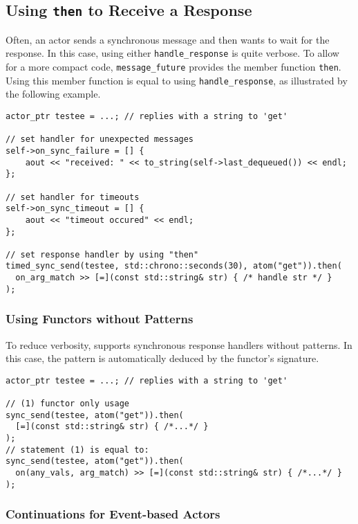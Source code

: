 \clearpage
\subsection{Using \lstinline^then^ to Receive a Response}

Often, an actor sends a synchronous message and then wants to wait for the response.
In this case, using either \lstinline^handle_response^ is quite verbose.
To allow for a more compact code, \lstinline^message_future^ provides the member function \lstinline^then^.
Using this member function is equal to using \lstinline^handle_response^, as illustrated by the following example.

\begin{lstlisting}
actor_ptr testee = ...; // replies with a string to 'get'

// set handler for unexpected messages
self->on_sync_failure = [] {
    aout << "received: " << to_string(self->last_dequeued()) << endl;
};

// set handler for timeouts
self->on_sync_timeout = [] {
    aout << "timeout occured" << endl;
};

// set response handler by using "then"
timed_sync_send(testee, std::chrono::seconds(30), atom("get")).then(
  on_arg_match >> [=](const std::string& str) { /* handle str */ }
);
\end{lstlisting}

\subsubsection{Using Functors without Patterns}

To reduce verbosity, \libcppa supports synchronous response handlers without patterns.
In this case, the pattern is automatically deduced by the functor's signature.

\begin{lstlisting}
actor_ptr testee = ...; // replies with a string to 'get'

// (1) functor only usage
sync_send(testee, atom("get")).then(
  [=](const std::string& str) { /*...*/ }
);
// statement (1) is equal to:
sync_send(testee, atom("get")).then(
  on(any_vals, arg_match) >> [=](const std::string& str) { /*...*/ }
);
\end{lstlisting}

\subsubsection{Continuations for Event-based Actors}

